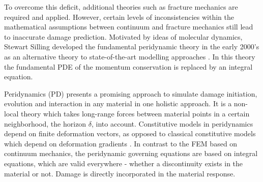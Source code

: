 To overcome this deficit, additional theories such as fracture mechanics are required and applied. However, certain levels of inconsistencies within the mathematical assumptions between continuum and fracture mechanics still lead to inaccurate damage prediction. Motivated by ideas of molecular dynamics, Stewart Silling developed the fundamental peridynamic theory in the early 2000's as an alternative theory to state-of-the-art modelling approaches \cite{SillingSA2000}. In this theory the fundamental PDE of the momentum conservation is replaced by an integral equation.

Peridynamics (PD) presents a promising approach to simulate damage initiation, evolution and interaction in any material in one holistic approach. It is a non-local theory which takes long-range forces between material points in a certain neighborhood, the horizon $\delta$, into account. Constitutive models in peridynamics depend on finite deformation vectors, as opposed to classical constitutive models which depend on deformation gradients \cite{SelesonP2016}. In contrast to the FEM based on continuum mechanics, the peridynamic governing equations are based on integral equations, which are valid everywhere - whether a discontinuity exists in the material or not. Damage is directly incorporated in the material response.

% 
